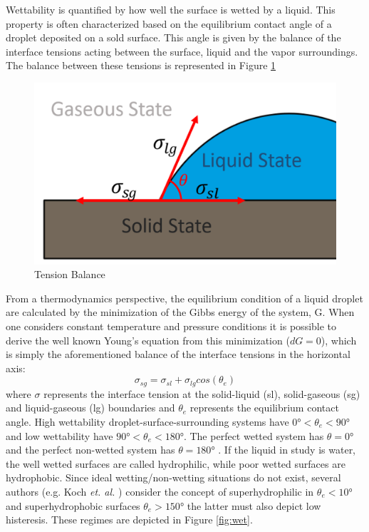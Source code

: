 \par Wettability is quantified by how well the surface is wetted by a liquid. This property is often characterized based on the equilibrium contact angle of a droplet deposited on a sold surface. This angle is given by the balance of the interface tensions acting between the surface, liquid and the vapor surroundings. The balance between these tensions is represented in Figure \ref{fig:tensao}
\begin{figure}[h]
\centering
\includegraphics[width=0.5\linewidth]{Figures/2.Chapter/tensao.PNG}
\caption{Tension Balance}
\label{fig:tensao}
\end{figure}
\par From a thermodynamics perspective, the equilibrium condition of a liquid droplet are calculated by the minimization of the Gibbs energy of the system, G. When one considers constant temperature and pressure conditions it is possible to derive the well known Young's equation \cite{young1805essay} from this minimization ($dG=0$), which is simply the aforementioned balance of the interface tensions in the horizontal axis:
\begin{equation}
\sigma_{sg}=\sigma_{sl}+\sigma_{lg}cos(\theta_e)
\end{equation}
where $\sigma$ represents the interface tension at the solid-liquid (sl), solid-gaseous (sg) and liquid-gaseous (lg) boundaries and $\theta_e$ represents the equilibrium contact angle. High wettability droplet-surface-surrounding systems have $0\si{\degree} <\theta_e<90\si{\degree} $ and low wettability have $90\si{\degree}<\theta_e<180\si{\degree} $. The perfect wetted system has $\theta=0\si{\degree} $ and the perfect non-wetted system has $\theta=180\si{\degree} $ \cite{choi2011wettability}. If the liquid in study is water, the well wetted surfaces are called hydrophilic, while poor wetted surfaces are hydrophobic. Since ideal wetting/non-wetting situations do not exist, several authors (e.g. Koch \textit{et. al.} \cite{koch2009superhydrophobic}) consider the concept of superhydrophilic in $\theta_e<10\si{\degree}$ and superhydrophobic surfaces $\theta_e>150\si{\degree}$ the latter must also depict low histeresis. These regimes are depicted in Figure \ref{fig:wet}.


